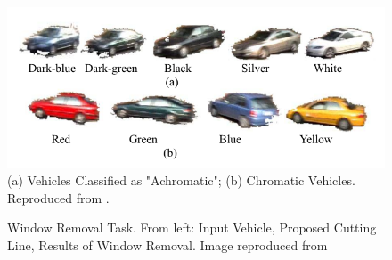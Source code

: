 \begin{figure}[hbt!]\centering
\includegraphics[width=.8\textwidth]{image/lit/carscolors.png}
\caption[Colour Appearance Categories of  Vehicle  Used  for  Colour Classification]{(a) Vehicles Classified as "Achromatic"; (b) Chromatic Vehicles. Reproduced from .}
\label{fig:sevenclasses}
\end{figure}

\begin{figure}[!htb]
  \centering
\caption[Window Removal Task. From left: Input Vehicle, Proposed Cutting Line, Results of Window Removal]{Window Removal Task. From left: Input Vehicle, Proposed Cutting Line, Results of Window Removal. Image reproduced from  \label{fig:windowremoval}}
\end{figure}

